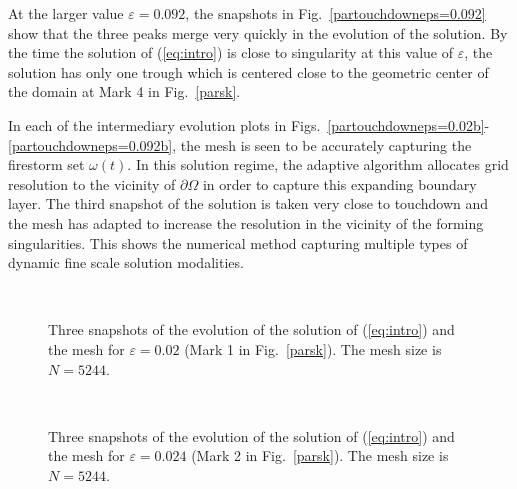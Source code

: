 \documentclass{siamart0516}
\renewcommand{\eqref}[1]{(\ref{#1})}
\newcommand{\eps}{\varepsilon}
\theoremstyle{plain}%
\theoremstyle{definition}
\theoremstyle{remark}
\begin{document}
At the larger value $\eps =0.092$, the snapshots in Fig.~\ref{partouchdowneps=0.092} show that the three peaks merge very quickly in the evolution of the solution. By the time the solution of \eqref{eq:intro}  is close to singularity at this value of $\eps$, the solution has only one trough which is centered close to the geometric center of the domain at Mark 4 in Fig.~\ref{parsk}.

In each of the intermediary evolution plots in Figs.~\ref{partouchdowneps=0.02b}-\ref{partouchdowneps=0.092b}, the mesh is seen to be accurately capturing the firestorm set $\omega(t)$. In this solution regime, the adaptive algorithm allocates grid resolution to the vicinity of $\partial\Omega$ in order to capture this expanding boundary layer. The third snapshot of the solution is taken very close to touchdown and the mesh has adapted to increase the resolution in the vicinity of the forming singularities. This shows the numerical method capturing multiple types of dynamic fine scale solution modalities.



\begin{figure}[!ht]
\qquad
{}\qquad
{}\\
\qquad
{}\qquad
{}
\caption{Three snapshots of the evolution of the solution of \eqref{eq:intro} and the mesh for $\eps = 0.02$  (Mark 1 in Fig.~\ref{parsk}). The mesh size is $N = 5244$. \label{partouchdowneps=0.02}}
\end{figure}

\begin{figure}[!hb]
\qquad
{}\qquad
{}\\
\qquad
{}\qquad
{}
\caption{Three snapshots of the evolution of the solution of \eqref{eq:intro} and the mesh for $\eps = 0.024$  (Mark 2 in Fig.~\ref{parsk}). The mesh size is $N = 5244$. \label{partouchdowneps=0.024}}
\end{figure}
\end{document}
